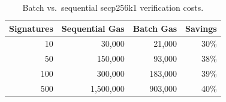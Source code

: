 \begin{table}[H]
\centering
\caption{Batch vs.\ sequential secp256k1 verification costs.}
\label{tab:batch_secp}
\begin{tabular}{rrrr}
\toprule
\textbf{Signatures} & \textbf{Sequential Gas} & \textbf{Batch Gas} & \textbf{Savings} \\
\midrule
10 & 30,000 & 21,000 & 30\% \\
50 & 150,000 & 93,000 & 38\% \\
100 & 300,000 & 183,000 & 39\% \\
500 & 1,500,000 & 903,000 & 40\% \\
\bottomrule
\end{tabular}
\end{table}

